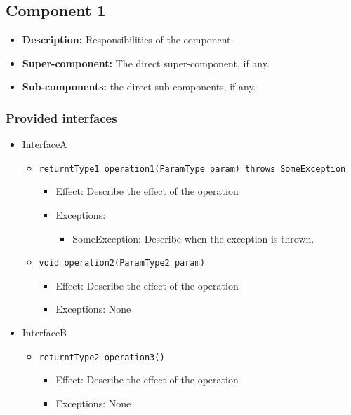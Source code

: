 \documentclass[a4paper,10pt]{article}
\begin{document}
\subsection{Component 1}
\begin{itemize}
    \item \textbf{Description:} Responsibilities of the component.
    \item \textbf{Super-component:} The direct super-component, if any.
    \item \textbf{Sub-components:} the direct sub-components, if any.
\end{itemize}

\subsubsection*{Provided interfaces}
\begin{itemize}
    \item InterfaceA
    \begin{itemize}
        \item \texttt{returntType1 operation1(ParamType param) throws SomeException}
        \begin{itemize}
            \item Effect: Describe the effect of the operation
            \item Exceptions:
            \begin{itemize}
                \item SomeException: Describe when the exception is thrown.
            \end{itemize}
		\end{itemize}
        \item \texttt{void operation2(ParamType2 param)}
        \begin{itemize}
            \item Effect: Describe the effect of the operation
            \item Exceptions: None
        \end{itemize}
    \end{itemize}

    \item InterfaceB
    \begin{itemize}
        \item \texttt{returntType2 operation3()}
        \begin{itemize}
            \item Effect: Describe the effect of the operation
            \item Exceptions: None
        \end{itemize}
    \end{itemize}
\end{itemize}
\end{document}
